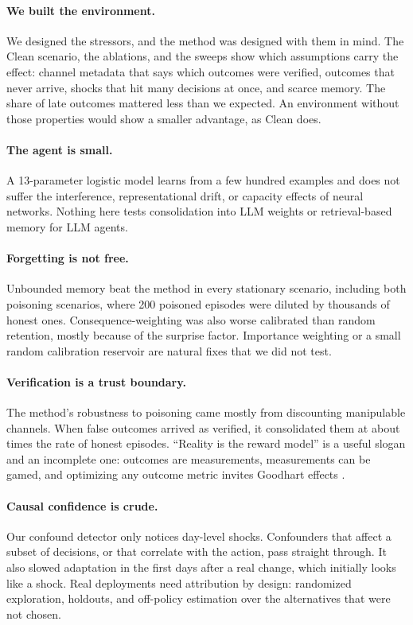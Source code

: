 \paragraph{We built the environment.} We designed the stressors, and the method was designed with them in mind. The Clean scenario, the ablations, and the sweeps show which assumptions carry the effect: channel metadata that says which outcomes were verified, outcomes that never arrive, shocks that hit many decisions at once, and scarce memory. The share of late outcomes mattered less than we expected. An environment without those properties would show a smaller advantage, as Clean does.

\paragraph{The agent is small.} A 13-parameter logistic model learns from a few hundred examples and does not suffer the interference, representational drift, or capacity effects of neural networks. Nothing here tests consolidation into LLM weights or retrieval-based memory for LLM agents.

\paragraph{Forgetting is not free.} Unbounded memory beat the method in every stationary scenario, including both poisoning scenarios, where 200 poisoned episodes were diluted by thousands of honest ones. Consequence-weighting was also worse calibrated than random retention, mostly because of the surprise factor. Importance weighting or a small random calibration reservoir are natural fixes that we did not test.

\paragraph{Verification is a trust boundary.} The method's robustness to poisoning came mostly from discounting manipulable channels. When false outcomes arrived as verified, it consolidated them at about  times the rate of honest episodes. ``Reality is the reward model'' is a useful slogan and an incomplete one: outcomes are measurements, measurements can be gamed, and optimizing any outcome metric invites Goodhart effects \citep{manheim2018goodhart}.

\paragraph{Causal confidence is crude.} Our confound detector only notices day-level shocks. Confounders that affect a subset of decisions, or that correlate with the action, pass straight through. It also slowed adaptation in the first days after a real change, which initially looks like a shock. Real deployments need attribution by design: randomized exploration, holdouts, and off-policy estimation over the alternatives that were not chosen.

